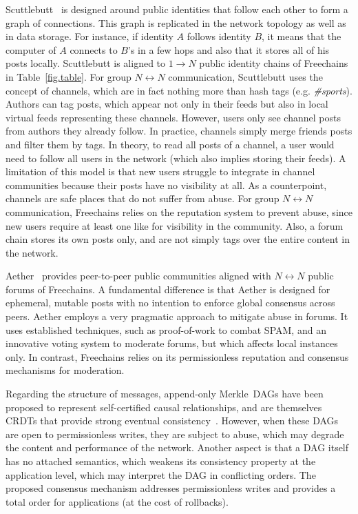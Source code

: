 \documentclass[10pt,journal,compsoc]{IEEEtran}
\newcommand{\FC}       {Freechains\xspace}
\newcommand{\Xon} {$1{\rightarrow}N$\xspace}
\newcommand{\Xnn} {$N{\leftrightarrow}N$\xspace}
\begin{document}
Scuttlebutt~\cite{p2p.scuttlebutt} is designed around public identities that
follow each other to form a graph of connections.
This graph is replicated in the network topology as well as in data storage.
For instance, if identity $A$ follows identity $B$, it means that the computer
of $A$ connects to $B$'s in a few hops and also that it stores all of his posts
locally.
Scuttlebutt is aligned to \Xon public identity chains of \FC in
Table~\ref{fig.table}.
%
For group \Xnn communication, Scuttlebutt uses the concept of channels, which
are in fact nothing more than hash tags (e.g. \emph{\#sports}).
Authors can tag posts, which appear not only in their feeds but also in local
virtual feeds representing these channels.
However, users only see channel posts from authors they already follow.
In practice, channels simply merge friends posts and filter them by tags.
In theory, to read all posts of a channel, a user would need to follow all
users in the network (which also implies storing their feeds).
A limitation of this model is that new users struggle to integrate in channel
communities because their posts have no visibility at all.
As a counterpoint, channels are safe places that do not suffer from abuse.
%
For group \Xnn communication, \FC relies on the reputation system to prevent
abuse, since new users require at least one like for visibility in the
community.
Also, a forum chain stores its own posts only, and are not simply tags over the
entire content in the network.

Aether~\cite{p2p.ecosystem} provides peer-to-peer public communities aligned
with \Xnn public forums of \FC.
A fundamental difference is that Aether is designed for ephemeral, mutable
posts with no intention to enforce global consensus across peers.
Aether employs a very pragmatic approach to mitigate abuse in forums.
It uses established techniques, such as proof-of-work to combat SPAM, and an
innovative voting system to moderate forums, but which affects local instances
only.
In contrast, \FC relies on its permissionless reputation and consensus
mechanisms for moderation.

Regarding the structure of messages, append-only Merkle~DAGs have been proposed
to represent self-certified causal relationships, and are themselves CRDTs that
provide strong eventual consistency~\cite{fed.matrix,p2p.byz}.
However, when these DAGs are open to permissionless writes, they are subject to
abuse, which may degrade the content and performance of the network.
Another aspect is that a DAG itself has no attached semantics, which weakens
its consistency property at the application level, which may interpret the DAG
in conflicting orders.
The proposed consensus mechanism addresses permissionless writes and provides
a total order for applications (at the cost of rollbacks).
\end{document}

